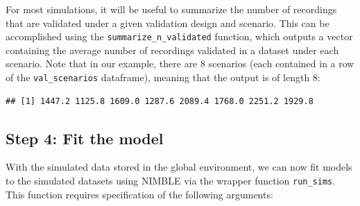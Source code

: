 \documentclass[
]{article}
\newenvironment{Shaded}{\begin{snugshade}}{\end{snugshade}}
\newcommand{\AttributeTok}[1]{\textcolor[rgb]{0.13,0.29,0.53}{#1}}
\newcommand{\FunctionTok}[1]{\textcolor[rgb]{0.13,0.29,0.53}{\textbf{#1}}}
\newcommand{\NormalTok}[1]{#1}
\newcommand{\SpecialCharTok}[1]{\textcolor[rgb]{0.81,0.36,0.00}{\textbf{#1}}}
\newcommand{\StringTok}[1]{\textcolor[rgb]{0.31,0.60,0.02}{#1}}
\begin{document}
\linespread{1}

For most simulations, it will be useful to summarize the number of recordings that are validated under a given validation design and scenario. This can be accomplished using the \texttt{summarize\_n\_validated} function, which outputs a vector containing the average number of recordings validated in a dataset under each scenario. Note that in our example, there are 8 scenarios (each contained in a row of the \texttt{val\_scenarios} dataframe), meaning that the output is of length 8:

\linespread{1}

\begin{Shaded}
\end{Shaded}

\begin{verbatim}
## [1] 1447.2 1125.8 1609.0 1287.6 2089.4 1768.0 2251.2 1929.8
\end{verbatim}

\linespread{1}

\hypertarget{step-4-fit-the-model}{%
\subsection{Step 4: Fit the model}\label{step-4-fit-the-model}}

With the simulated data stored in the global environment, we can now fit models to the simulated datasets using NIMBLE via the wrapper function \texttt{run\_sims}. This function requires specification of the following arguments:
\end{document}
